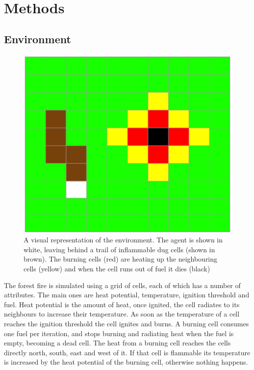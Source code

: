 
\section{Methods}\label{sec:methods}

\subsection{Environment}\label{sec:environment}
\begin{figure}[h]
    \centering
    \includegraphics[width=\linewidth]{img/Simulation.png}
    \caption{A visual representation of the environment. The agent is shown in white, leaving behind a trail of inflammable dug cells (shown in brown). The burning cells (red) are heating up the neighbouring cells (yellow) and when the cell runs out of fuel it dies (black)}
    \label{fig:simulation}
\end{figure}
The forest fire is simulated using a grid of cells, each of which has a number of attributes. The main ones are heat potential, temperature, ignition threshold and fuel. Heat potential is the amount of heat, once ignited, the cell radiates to its neighbours to increase their temperature. As soon as the temperature of a cell reaches the ignition threshold the cell ignites and burns. A burning cell consumes one fuel per iteration, and stops burning and radiating heat when the fuel is empty, becoming a dead cell. The heat from a burning cell reaches the cells directly north, south, east and west of it. If that cell is flammable its temperature is increased by the heat potential of the burning cell, otherwise nothing happens.

